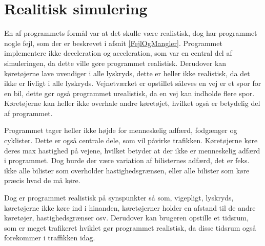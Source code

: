 \vspace{5mm}

\section{Realitisk simulering}
En af programmets formål var at det skulle være realistisk, dog har programmet nogle fejl, som der er beskrevet i afsnit \ref{FejlOgMangler}. Programmet implementere ikke deceleration og acceleration, som var en central del af simuleringen, da dette ville gøre programmet realistisk. Derudover kan køretøjerne lave uvendiger i alle lyskryds, dette er heller ikke realistisk, da det ikke er livligt i alle lyskryds. Vejnetværket er opstillet såleves en vej er et spor for en bil, dette gør også programmet urealistisk, da en vej kan indholde flere spor. Køretøjerne kan heller ikke overhale andre køretøjet, hvilket også er betydelig del af programmet. 

\vspace{5mm}

Programmet tager heller ikke højde for menneskelig adfærd, fodgænger og cyklister. Dette er også centrale dele, som vil påvirke trafikken. Køretøjerne køre deres max hastighed på vejene, hvilket betyder at der ikke er menneskelig adfærd i programmet. Dog burde der være variation af bilisternes adfærd, det er feks. ikke alle bilister som overholder hastighedsgrænsen, eller alle bilister som køre præcis hvad de må køre. 

\vspace{5mm}

Dog er programmet realistisk på synspunkter så som, vigepligt, lyskryds, køretøjerne ikke køre ind i hinanden, køretøjerner holder en afstand til de andre køretøjer, hastighedsgrænser osv. Derudover kan brugeren opstille et tidsrum, som er meget trafikeret hviklet gør programmet realistisk, da disse tidsrum også forekommer i traffikken idag. 


